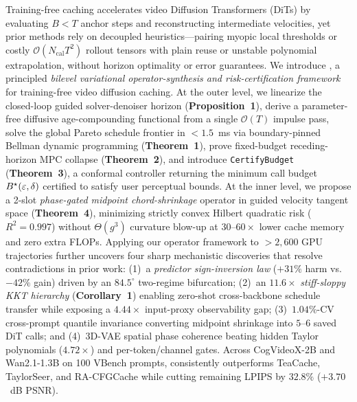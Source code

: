 Training-free caching accelerates video Diffusion Transformers (DiTs) by evaluating $B < T$ anchor steps and reconstructing intermediate velocities, yet prior methods rely on decoupled heuristics---pairing myopic local thresholds or costly $\mathcal{O}(N_{\mathrm{cal}} T^2)$ rollout tensors with plain reuse or unstable polynomial extrapolation, without horizon optimality or error guarantees. We introduce \textbf{\method{}}, a principled \emph{bilevel variational operator-synthesis and risk-certification framework} for training-free video diffusion caching. At the outer level, we linearize the closed-loop guided solver-denoiser horizon (\textbf{Proposition~1}), derive a parameter-free diffusive age-compounding functional from a single $\mathcal{O}(T)$ impulse pass, solve the global Pareto schedule frontier in $<1.5$~ms via boundary-pinned Bellman dynamic programming (\textbf{Theorem~1}), prove fixed-budget receding-horizon MPC collapse (\textbf{Theorem~2}), and introduce \texttt{CertifyBudget} (\textbf{Theorem~3}), a conformal controller returning the minimum call budget $B^\star(\varepsilon, \delta)$ certified to satisfy user perceptual bounds. At the inner level, we propose a 2-slot \emph{phase-gated midpoint chord-shrinkage} operator in guided velocity tangent space (\textbf{Theorem~4}), minimizing strictly convex Hilbert quadratic risk ($R^2 = 0.997$) without $\Theta(g^3)$ curvature blow-up at $30\text{--}60\times$ lower cache memory and zero extra FLOPs. Applying our operator framework to $>2{,}600$ GPU trajectories further uncovers four sharp mechanistic discoveries that resolve contradictions in prior work: (1)~a \emph{predictor sign-inversion law} ($+31\%$ harm vs.\ $-42\%$ gain) driven by an $84.5^\circ$ two-regime bifurcation; (2)~an $11.6\times$ \emph{stiff-sloppy KKT hierarchy} (\textbf{Corollary~1}) enabling zero-shot cross-backbone schedule transfer while exposing a $4.44\times$ input-proxy observability gap; (3)~$1.04\%$-CV cross-prompt quantile invariance converting midpoint shrinkage into $5\text{--}6$ saved DiT calls; and (4)~3D-VAE spatial phase coherence beating hidden Taylor polynomials ($4.72\times$) and per-token/channel gates. Across CogVideoX-2B and Wan2.1-1.3B on 100 VBench prompts, \method{} consistently outperforms TeaCache, TaylorSeer, and RA-CFGCache while cutting remaining LPIPS by $32.8\%$ ($+3.70$~dB PSNR).

